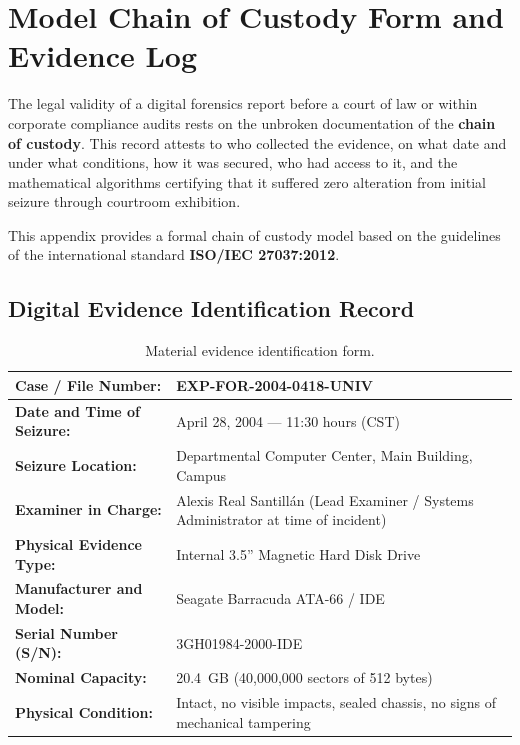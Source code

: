 \chapter{Model Chain of Custody Form and Evidence Log}

The legal validity of a digital forensics report before a court of law or within corporate compliance audits rests on the unbroken documentation of the \textbf{chain of custody}. This record attests to who collected the evidence, on what date and under what conditions, how it was secured, who had access to it, and the mathematical algorithms certifying that it suffered zero alteration from initial seizure through courtroom exhibition.

This appendix provides a formal chain of custody model based on the guidelines of the international standard \textbf{ISO/IEC 27037:2012}.

\section{Digital Evidence Identification Record}

\begin{table}[htbp]
\centering
\small
\begin{tabularx}{\textwidth}{|l|X|}
\hline
\textbf{Case / File Number:} & EXP-FOR-2004-0418-UNIV \\ \hline
\textbf{Date and Time of Seizure:} & April 28, 2004 --- 11:30 hours (CST) \\ \hline
\textbf{Seizure Location:} & Departmental Computer Center, Main Building, Campus \\ \hline
\textbf{Examiner in Charge:} & Alexis Real Santillán (Lead Examiner / Systems Administrator at time of incident) \\ \hline
\textbf{Physical Evidence Type:} & Internal 3.5'' Magnetic Hard Disk Drive \\ \hline
\textbf{Manufacturer and Model:} & Seagate Barracuda ATA-66 / IDE \\ \hline
\textbf{Serial Number (S/N):} & 3GH01984-2000-IDE \\ \hline
\textbf{Nominal Capacity:} & 20.4~GB (40,000,000 sectors of 512 bytes) \\ \hline
\textbf{Physical Condition:} & Intact, no visible impacts, sealed chassis, no signs of mechanical tampering \\ \hline
\end{tabularx}
\caption{Material evidence identification form.}
\end{table}

